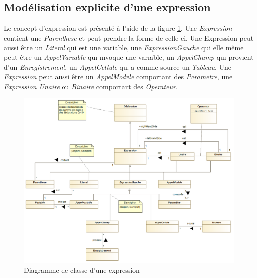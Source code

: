 
\subsection{Modélisation explicite d'une expression}
\label{sec:question12}

Le concept d'expression est présenté à l'aide de la figure \ref{fig:expression}. Une \emph{Expression} contient une \emph{Parenthese} et peut prendre la forme de celle-ci. Une Expression peut aussi être un \emph{Literal} qui est une variable, une 
\emph{ExpressionGauche} qui elle même peut être un \emph{AppelVariable} qui invoque une variable, un \emph{AppelChamp} qui provient d'un \emph{Enregistrement}, un \emph{AppelCellule} qui a comme source un \emph{Tableau}. Une \emph{Expression} peut aussi être
un \emph{AppelModule} comportant des \emph{Parametre}, une \emph{Expression Unaire} ou \emph{Binaire} comportant des \emph{Operateur}.

\begin{figure}[h!]
	\centering
	\includegraphics[width=450pt]{assets/class__Expression}
	\caption{Diagramme de classe d'une expression}
	\label{fig:expression}
\end{figure}

\newpage